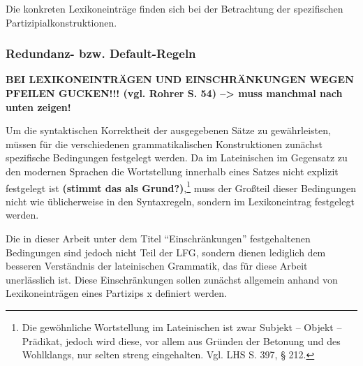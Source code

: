 \documentclass[12pt,a4paper]{article}
\begin{document}
Die konkreten Lexikoneinträge finden sich bei der Betrachtung der spezifischen Partizipialkonstruktionen.













\subsubsection{Redundanz- bzw. Default-Regeln}
\textbf{BEI LEXIKONEINTRÄGEN UND EINSCHRÄNKUNGEN WEGEN PFEILEN GUCKEN!!! (vgl. Rohrer S. 54) --> muss manchmal nach unten zeigen!}


Um die syntaktischen Korrektheit der ausgegebenen Sätze zu gewährleisten, müssen für die verschiedenen grammatikalischen Konstruktionen zunächst spezifische Bedingungen festgelegt werden.
Da im Lateinischen im Gegensatz zu den modernen Sprachen die Wortstellung innerhalb eines Satzes nicht explizit festgelegt ist \textbf{(stimmt das als Grund?)},\footnote{Die gewöhnliche Wortstellung im Lateinischen ist zwar Subjekt – Objekt – Prädikat, jedoch wird diese, vor allem aus Gründen der Betonung und des Wohlklangs, nur selten streng eingehalten. Vgl. LHS S. 397, § 212.} muss der Großteil dieser Bedingungen nicht wie üblicherweise in den Syntaxregeln, sondern im Lexikoneintrag festgelegt werden.

Die in dieser Arbeit unter dem Titel ``Einschränkungen'' festgehaltenen Bedingungen sind jedoch nicht Teil der LFG, sondern dienen lediglich dem besseren Verständnis der lateinischen Grammatik, das für diese Arbeit unerlässlich ist. Diese Einschränkungen sollen zunächst allgemein anhand von Lexikoneinträgen eines Partizips x definiert werden. 
\end{document}
